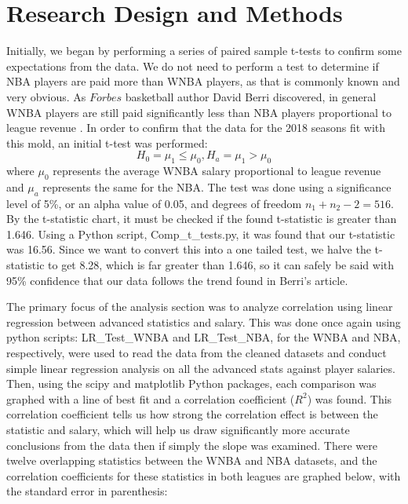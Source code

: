 \documentclass[12pt]{article}
\begin{document}
\section{Research Design and Methods}
Initially, we began by performing a series of paired sample t-tests to confirm some expectations from the data. We do not need to perform a test to 
determine if NBA players are paid more than WNBA players, as that is commonly known and very obvious. As $\textit{Forbes}$ basketball author David Berri 
discovered, in general WNBA players are still paid significantly less than NBA players proportional to league revenue \citep{WNBA_Revenue}. In order to 
confirm that the data for the 2018 seasons fit with this mold, an initial t-test was performed:
$$H_0 = \mu_1 \leq \mu_0, H_a = \mu_1 > \mu_0$$
where $\mu_0$ represents the average WNBA salary proportional to league revenue and $\mu_a$ represents the same for the NBA. The test was done using a 
significance level of  5\%, or an alpha value of 0.05, and degrees of freedom $n_1 + n_2 - 2 = 516$. By the t-statistic chart, it must be checked if the 
found t-statistic is greater than 1.646. Using a Python script, Comp\_t\_tests.py, it was found that our t-statistic was 16.56. Since we want to convert 
this into a one tailed test, we halve the t-statistic to get 8.28, which is far greater than 1.646, so it can safely be said with 95\% confidence that our 
data follows the trend found in Berri's article.
\par
The primary focus of the analysis section was to analyze correlation using linear regression between advanced statistics and salary. This was done once 
again using python scripts: LR\_Test\_WNBA and LR\_Test\_NBA, for the WNBA and NBA, respectively, were used to read the data from the cleaned datasets and 
conduct simple linear regression analysis on all the advanced stats against player salaries. Then, using the scipy and matplotlib Python packages, each 
comparison was graphed with a line of best fit and a correlation coefficient ($R^2$) was found. This correlation coefficient tells us how strong the 
correlation effect is between the statistic and salary, which will help us draw significantly more accurate conclusions from the data then if simply the 
slope was examined. There were twelve overlapping statistics between the WNBA and NBA datasets, and the correlation coefficients for these statistics in 
both leagues are graphed below, with the standard error in parenthesis:
\end{document}
